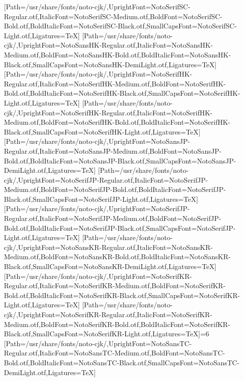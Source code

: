 \newfontfamily{}[Path=/usr/share/fonts/noto-cjk/,UprightFont=NotoSerifSC-Regular.otf,ItalicFont=NotoSerifSC-Medium.otf,BoldFont=NotoSerifSC-Bold.otf,BoldItalicFont=NotoSerifSC-Black.otf,SmallCapsFont=NotoSerifSC-Light.otf,Ligatures=TeX]
\newfontfamily{}[Path=/usr/share/fonts/noto-cjk/,UprightFont=NotoSansHK-Regular.otf,ItalicFont=NotoSansHK-Medium.otf,BoldFont=NotoSansHK-Bold.otf,BoldItalicFont=NotoSansHK-Black.otf,SmallCapsFont=NotoSansHK-DemiLight.otf,Ligatures=TeX]
\newfontfamily{}[Path=/usr/share/fonts/noto-cjk/,UprightFont=NotoSerifHK-Regular.otf,ItalicFont=NotoSerifHK-Medium.otf,BoldFont=NotoSerifHK-Bold.otf,BoldItalicFont=NotoSerifHK-Black.otf,SmallCapsFont=NotoSerifHK-Light.otf,Ligatures=TeX]
\newfontfamily{}[Path=/usr/share/fonts/noto-cjk/,UprightFont=NotoSerifHK-Regular.otf,ItalicFont=NotoSerifHK-Medium.otf,BoldFont=NotoSerifHK-Bold.otf,BoldItalicFont=NotoSerifHK-Black.otf,SmallCapsFont=NotoSerifHK-Light.otf,Ligatures=TeX]
\newfontfamily{}[Path=/usr/share/fonts/noto-cjk/,UprightFont=NotoSansJP-Regular.otf,ItalicFont=NotoSansJP-Medium.otf,BoldFont=NotoSansJP-Bold.otf,BoldItalicFont=NotoSansJP-Black.otf,SmallCapsFont=NotoSansJP-DemiLight.otf,Ligatures=TeX]
\newfontfamily{}[Path=/usr/share/fonts/noto-cjk/,UprightFont=NotoSerifJP-Regular.otf,ItalicFont=NotoSerifJP-Medium.otf,BoldFont=NotoSerifJP-Bold.otf,BoldItalicFont=NotoSerifJP-Black.otf,SmallCapsFont=NotoSerifJP-Light.otf,Ligatures=TeX]
\newfontfamily{}[Path=/usr/share/fonts/noto-cjk/,UprightFont=NotoSerifJP-Regular.otf,ItalicFont=NotoSerifJP-Medium.otf,BoldFont=NotoSerifJP-Bold.otf,BoldItalicFont=NotoSerifJP-Black.otf,SmallCapsFont=NotoSerifJP-Light.otf,Ligatures=TeX]
\newfontfamily{}[Path=/usr/share/fonts/noto-cjk/,UprightFont=NotoSansKR-Regular.otf,ItalicFont=NotoSansKR-Medium.otf,BoldFont=NotoSansKR-Bold.otf,BoldItalicFont=NotoSansKR-Black.otf,SmallCapsFont=NotoSansKR-DemiLight.otf,Ligatures=TeX]
\newfontfamily{}[Path=/usr/share/fonts/noto-cjk/,UprightFont=NotoSerifKR-Regular.otf,ItalicFont=NotoSerifKR-Medium.otf,BoldFont=NotoSerifKR-Bold.otf,BoldItalicFont=NotoSerifKR-Black.otf,SmallCapsFont=NotoSerifKR-Light.otf,Ligatures=TeX]
\newfontfamily{}[Path=/usr/share/fonts/noto-cjk/,UprightFont=NotoSerifKR-Regular.otf,ItalicFont=NotoSerifKR-Medium.otf,BoldFont=NotoSerifKR-Bold.otf,BoldItalicFont=NotoSerifKR-Black.otf,SmallCapsFont=NotoSerifKR-Light.otf,Ligatures=TeX]\else\ifnum\value{NotoCJKFamily}=6
\newfontfamily{}[Path=/usr/share/fonts/noto-cjk/,UprightFont=NotoSansTC-Regular.otf,ItalicFont=NotoSansTC-Medium.otf,BoldFont=NotoSansTC-Bold.otf,BoldItalicFont=NotoSansTC-Black.otf,SmallCapsFont=NotoSansTC-DemiLight.otf,Ligatures=TeX]
